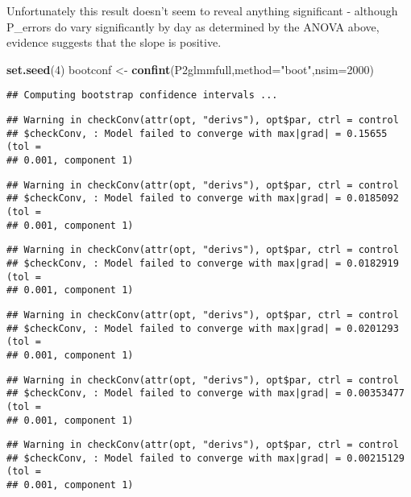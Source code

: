 \documentclass[]{article}
\newenvironment{Shaded}{\begin{snugshade}}{\end{snugshade}}
\newcommand{\KeywordTok}[1]{\textcolor[rgb]{0.13,0.29,0.53}{\textbf{#1}}}
\newcommand{\DataTypeTok}[1]{\textcolor[rgb]{0.13,0.29,0.53}{#1}}
\newcommand{\DecValTok}[1]{\textcolor[rgb]{0.00,0.00,0.81}{#1}}
\newcommand{\StringTok}[1]{\textcolor[rgb]{0.31,0.60,0.02}{#1}}
\newcommand{\NormalTok}[1]{#1}
\begin{document}
Unfortunately this result doesn't seem to reveal anything significant -
although P\_errors do vary significantly by day as determined by the
ANOVA above, evidence suggests that the slope is positive.

\begin{Shaded}
\begin{Highlighting}[]
\KeywordTok{set.seed}\NormalTok{(}\DecValTok{4}\NormalTok{)}
\NormalTok{bootconf <-}\StringTok{ }\KeywordTok{confint}\NormalTok{(P2glmmfull,}\DataTypeTok{method=}\StringTok{"boot"}\NormalTok{,}\DataTypeTok{nsim=}\DecValTok{2000}\NormalTok{)}
\end{Highlighting}
\end{Shaded}

\begin{verbatim}
## Computing bootstrap confidence intervals ...
\end{verbatim}

\begin{verbatim}
## Warning in checkConv(attr(opt, "derivs"), opt$par, ctrl = control
## $checkConv, : Model failed to converge with max|grad| = 0.15655 (tol =
## 0.001, component 1)
\end{verbatim}

\begin{verbatim}
## Warning in checkConv(attr(opt, "derivs"), opt$par, ctrl = control
## $checkConv, : Model failed to converge with max|grad| = 0.0185092 (tol =
## 0.001, component 1)
\end{verbatim}

\begin{verbatim}
## Warning in checkConv(attr(opt, "derivs"), opt$par, ctrl = control
## $checkConv, : Model failed to converge with max|grad| = 0.0182919 (tol =
## 0.001, component 1)
\end{verbatim}

\begin{verbatim}
## Warning in checkConv(attr(opt, "derivs"), opt$par, ctrl = control
## $checkConv, : Model failed to converge with max|grad| = 0.0201293 (tol =
## 0.001, component 1)
\end{verbatim}

\begin{verbatim}
## Warning in checkConv(attr(opt, "derivs"), opt$par, ctrl = control
## $checkConv, : Model failed to converge with max|grad| = 0.00353477 (tol =
## 0.001, component 1)
\end{verbatim}

\begin{verbatim}
## Warning in checkConv(attr(opt, "derivs"), opt$par, ctrl = control
## $checkConv, : Model failed to converge with max|grad| = 0.00215129 (tol =
## 0.001, component 1)
\end{verbatim}
\end{document}
